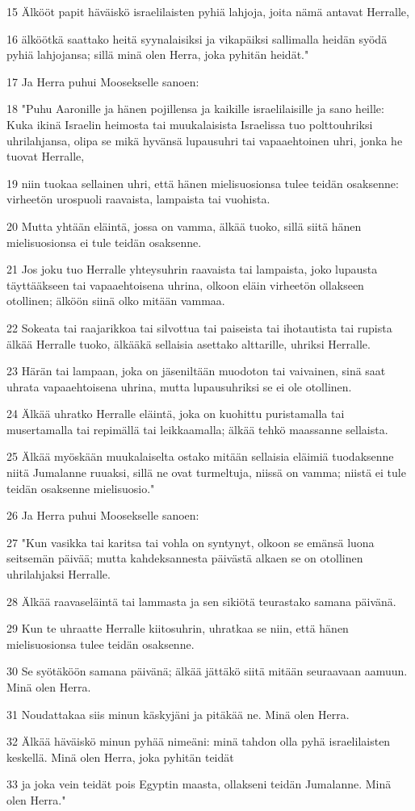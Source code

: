 \par 15 Älkööt papit häväiskö israelilaisten pyhiä lahjoja, joita nämä antavat Herralle,
\par 16 älköötkä saattako heitä syynalaisiksi ja vikapäiksi sallimalla heidän syödä pyhiä lahjojansa; sillä minä olen Herra, joka pyhitän heidät."
\par 17 Ja Herra puhui Moosekselle sanoen:
\par 18 "Puhu Aaronille ja hänen pojillensa ja kaikille israelilaisille ja sano heille: Kuka ikinä Israelin heimosta tai muukalaisista Israelissa tuo polttouhriksi uhrilahjansa, olipa se mikä hyvänsä lupausuhri tai vapaaehtoinen uhri, jonka he tuovat Herralle,
\par 19 niin tuokaa sellainen uhri, että hänen mielisuosionsa tulee teidän osaksenne: virheetön urospuoli raavaista, lampaista tai vuohista.
\par 20 Mutta yhtään eläintä, jossa on vamma, älkää tuoko, sillä siitä hänen mielisuosionsa ei tule teidän osaksenne.
\par 21 Jos joku tuo Herralle yhteysuhrin raavaista tai lampaista, joko lupausta täyttääkseen tai vapaaehtoisena uhrina, olkoon eläin virheetön ollakseen otollinen; älköön siinä olko mitään vammaa.
\par 22 Sokeata tai raajarikkoa tai silvottua tai paiseista tai ihotautista tai rupista älkää Herralle tuoko, älkääkä sellaisia asettako alttarille, uhriksi Herralle.
\par 23 Härän tai lampaan, joka on jäseniltään muodoton tai vaivainen, sinä saat uhrata vapaaehtoisena uhrina, mutta lupausuhriksi se ei ole otollinen.
\par 24 Älkää uhratko Herralle eläintä, joka on kuohittu puristamalla tai musertamalla tai repimällä tai leikkaamalla; älkää tehkö maassanne sellaista.
\par 25 Älkää myöskään muukalaiselta ostako mitään sellaisia eläimiä tuodaksenne niitä Jumalanne ruuaksi, sillä ne ovat turmeltuja, niissä on vamma; niistä ei tule teidän osaksenne mielisuosio."
\par 26 Ja Herra puhui Moosekselle sanoen:
\par 27 "Kun vasikka tai karitsa tai vohla on syntynyt, olkoon se emänsä luona seitsemän päivää; mutta kahdeksannesta päivästä alkaen se on otollinen uhrilahjaksi Herralle.
\par 28 Älkää raavaseläintä tai lammasta ja sen sikiötä teurastako samana päivänä.
\par 29 Kun te uhraatte Herralle kiitosuhrin, uhratkaa se niin, että hänen mielisuosionsa tulee teidän osaksenne.
\par 30 Se syötäköön samana päivänä; älkää jättäkö siitä mitään seuraavaan aamuun. Minä olen Herra.
\par 31 Noudattakaa siis minun käskyjäni ja pitäkää ne. Minä olen Herra.
\par 32 Älkää häväiskö minun pyhää nimeäni: minä tahdon olla pyhä israelilaisten keskellä. Minä olen Herra, joka pyhitän teidät
\par 33 ja joka vein teidät pois Egyptin maasta, ollakseni teidän Jumalanne. Minä olen Herra."

